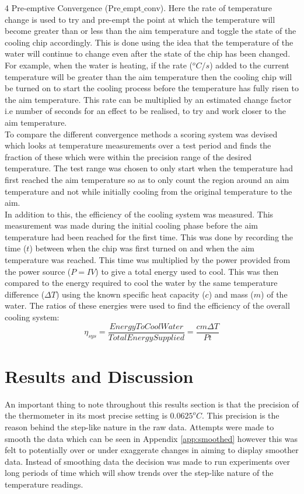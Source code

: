 \documentclass[10pt]{article}
\begin{document}
4 Pre-emptive Convergence (Pre$\_$empt$\_$conv). Here the rate of temperature change is used to try and pre-empt the point at which the temperature will become greater than or less than the aim temperature and toggle the state of the cooling chip accordingly. This is done using the idea that the temperature of the water will continue to change even after the state of the chip has been changed. For example, when the water is heating, if the rate ($^oC/s$) added to the current temperature will be greater than the aim temperature then the cooling chip will be turned on to start the cooling process before the temperature has fully risen to the aim temperature. This rate can be multiplied by an estimated change factor i.e number of seconds for an effect to be realised, to try and work closer to the aim temperature.\\

To compare the different convergence methods a scoring system was devised which looks at temperature measurements over a test period and finds the fraction of these which were within the precision range of the desired temperature. The test range was chosen to only start when the temperature had first reached the aim temperature so as to only count the region around an aim temperature and not while initially cooling from the original temperature to the aim.   \\

In addition to this, the efficiency of the cooling system was measured. This measurement was made during the initial cooling phase before the aim temperature had been reached for the first time. This was done by recording the time ($t$) between when the chip was first turned on and when the aim temperature was reached. This time was multiplied by the power provided from the power source ($P=IV$) to give a total energy used to cool. This was then compared to the energy required to cool the water by the same temperature difference ($\Delta T$) using the known specific heat capacity ($c$) and mass ($m$) of the water. The ratios of these energies were used to find the efficiency of the overall cooling system:
\begin{equation}
    \eta_{sys} = \frac{EnergyToCoolWater}{TotalEnergySupplied} = \frac{cm\Delta T}{Pt}
\end{equation}


\section*{Results and Discussion}
An important thing to note throughout this results section is that the precision of the thermometer in its most precise setting is $0.0625^oC$. This precision is the reason behind the step-like nature in the raw data. Attempts were made to smooth the data which can be seen in Appendix \ref{app:smoothed} however this was felt to potentially over or under exaggerate changes in aiming to display smoother data. Instead of smoothing data the decision was made to run experiments over long periods of time which will show trends over the step-like nature of the temperature readings. \\
\end{document}
